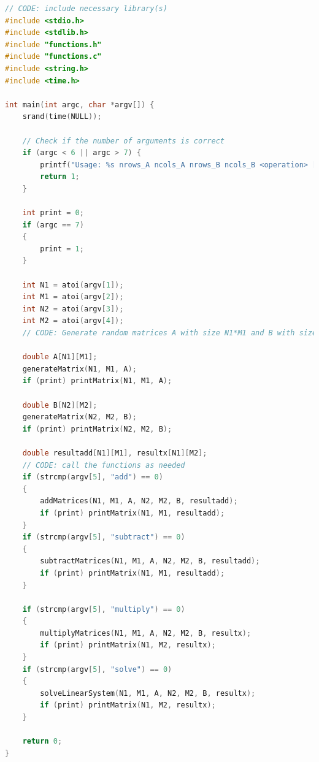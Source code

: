 \documentclass{article}
\begin{document}
\begin{lstlisting}[language=C, caption=math\_matrix.c]
// CODE: include necessary library(s)
#include <stdio.h>
#include <stdlib.h>
#include "functions.h"
#include "functions.c"
#include <string.h>
#include <time.h>

int main(int argc, char *argv[]) {
    srand(time(NULL));

    // Check if the number of arguments is correct
    if (argc < 6 || argc > 7) {
        printf("Usage: %s nrows_A ncols_A nrows_B ncols_B <operation> [print]\n", argv[0]);
        return 1;
    }

    int print = 0;
    if (argc == 7)
    {
        print = 1;
    }

    int N1 = atoi(argv[1]);
    int M1 = atoi(argv[2]);
    int N2 = atoi(argv[3]);
    int M2 = atoi(argv[4]);
    // CODE: Generate random matrices A with size N1*M1 and B with size N2*M2
    
    double A[N1][M1];
    generateMatrix(N1, M1, A);
    if (print) printMatrix(N1, M1, A);

    double B[N2][M2];
    generateMatrix(N2, M2, B);
    if (print) printMatrix(N2, M2, B);

    double resultadd[N1][M1], resultx[N1][M2];
    // CODE: call the functions as needed
    if (strcmp(argv[5], "add") == 0)
    {
        addMatrices(N1, M1, A, N2, M2, B, resultadd);
        if (print) printMatrix(N1, M1, resultadd);
    }
    if (strcmp(argv[5], "subtract") == 0)
    {
        subtractMatrices(N1, M1, A, N2, M2, B, resultadd);
        if (print) printMatrix(N1, M1, resultadd);
    }

    if (strcmp(argv[5], "multiply") == 0)
    {
        multiplyMatrices(N1, M1, A, N2, M2, B, resultx);
        if (print) printMatrix(N1, M2, resultx);
    }
    if (strcmp(argv[5], "solve") == 0)
    {
        solveLinearSystem(N1, M1, A, N2, M2, B, resultx);
        if (print) printMatrix(N1, M2, resultx);
    }

    return 0;
}
\end{lstlisting}
\end{document}
